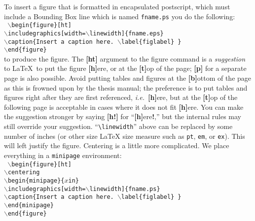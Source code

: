 To insert a figure that is formatted in encapsulated postscript, which
must include a Bounding Box line which is named \texttt{fname.ps} you
do the following:
\\
\texttt{ \hspace*{0.5in} $\backslash$begin\{figure\}[ht]
  \\
  \hspace*{0.75in}
  $\backslash$includegraphics[width=$\backslash$linewidth]\{fname.eps\}
  \\
  \hspace*{0.75in} $\backslash$caption\{Insert a caption
  here. $\backslash$label\{figlabel\} \}
  \\
  \hspace*{0.5in} $\backslash$end\{figure\} }
\\
to produce the figure. The \textbf{[ht]} argument to the figure
command is a \emph{suggestion} to \LaTeX\ to put the figure
\textbf{[h]}ere, or at the \textbf{[t]}op of the page; \textbf{[p]}
for a separate page is also possible.
Avoid putting tables and
figures at the \textbf{[b]}ottom of the page as this is frowned upon
by the thesis manual; the
preference is to put tables and figures right
after they are first referenced, \emph{i.e.}\ \textbf{[h]}ere, but
at the \textbf{[t]}op of the following page is acceptable in cases
where it does not fit \textbf{[h]}ere.  You can make the suggestion
stronger by saying \textbf{[h!]}  for ``\textbf{[h]}ere\textbf{!},''
but the internal rules may still override your suggestion.
``\verb+\linewidth+'' above can be replaced by some
number of inches (or other size \LaTeX{} size measure such as
\texttt{pt}, \texttt{em}, or \texttt{ex}).  This will left justify the
figure.  Centering is a little more complicated.  We place everything
in a \texttt{minipage} environment:
\\
\texttt{ \hspace*{0.5in} $\backslash$begin\{figure\}[ht]
  \\
  \hspace*{0.75in} $\backslash$centering
  \\
  \hspace*{0.75in} $\backslash$begin\{minipage\}\{$x$in\}
  \\
  \hspace*{1.0in}
  $\backslash$includegraphics[width=$\backslash$linewidth]\{fname.ps\}
  \\
  \hspace*{1.0in} $\backslash$caption\{Insert a caption
  here. $\backslash$label\{figlabel\} \}
  \\
  \hspace*{0.75in} $\backslash$end\{minipage\}
  \\
  \hspace*{0.5in} $\backslash$end\{figure\} }

